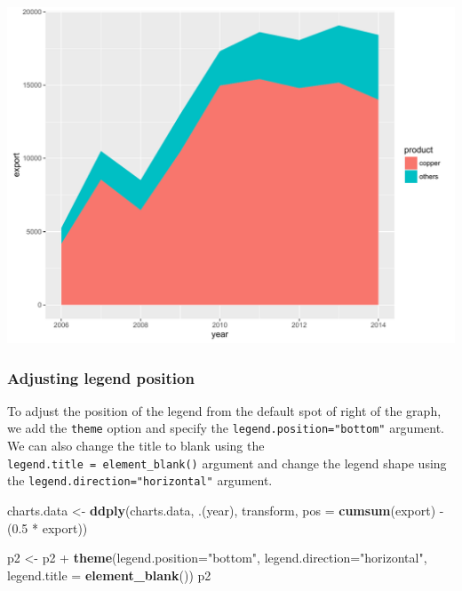 \documentclass[]{article}
\newenvironment{Shaded}{\begin{snugshade}}{\end{snugshade}}
\newcommand{\KeywordTok}[1]{\textcolor[rgb]{0.13,0.29,0.53}{\textbf{{#1}}}}
\newcommand{\DataTypeTok}[1]{\textcolor[rgb]{0.13,0.29,0.53}{{#1}}}
\newcommand{\FloatTok}[1]{\textcolor[rgb]{0.00,0.00,0.81}{{#1}}}
\newcommand{\StringTok}[1]{\textcolor[rgb]{0.31,0.60,0.02}{{#1}}}
\newcommand{\NormalTok}[1]{{#1}}
\begin{document}
\begin{center}\includegraphics{0_all_posts_pdf/area_1-1} \end{center}

\subsubsection{Adjusting legend
position}\label{adjusting-legend-position}

To adjust the position of the legend from the default spot of right of
the graph, we add the \texttt{theme} option and specify the
\texttt{legend.position="bottom"} argument. We can also change the title
to blank using the \texttt{legend.title\ =\ element\_blank()} argument
and change the legend shape using the
\texttt{legend.direction="horizontal"} argument.

\begin{Shaded}
\begin{Highlighting}[]
\NormalTok{charts.data <-}\StringTok{ }\KeywordTok{ddply}\NormalTok{(charts.data, .(year), transform, }\DataTypeTok{pos =} \KeywordTok{cumsum}\NormalTok{(export) -}\StringTok{ }\NormalTok{(}\FloatTok{0.5} \NormalTok{*}\StringTok{ }\NormalTok{export))}

\NormalTok{p2 <-}\StringTok{ }\NormalTok{p2 +}\StringTok{ }\KeywordTok{theme}\NormalTok{(}\DataTypeTok{legend.position=}\StringTok{"bottom"}\NormalTok{, }\DataTypeTok{legend.direction=}\StringTok{"horizontal"}\NormalTok{, }\DataTypeTok{legend.title =} \KeywordTok{element_blank}\NormalTok{())}
\NormalTok{p2}
\end{Highlighting}
\end{Shaded}
\end{document}
